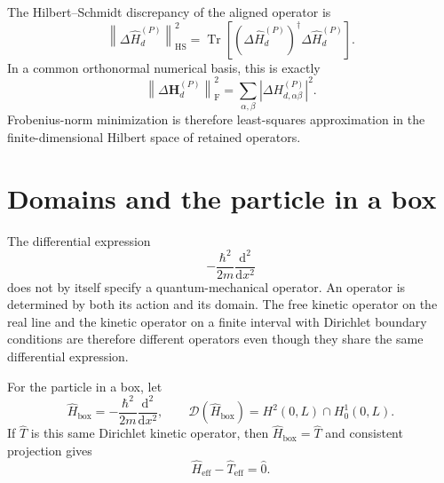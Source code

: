 The Hilbert--Schmidt discrepancy of the aligned operator is
\begin{equation}
    \left\lVert
        \Delta\hat H_d^{(P)}
    \right\rVert_{\mathrm{HS}}^2
    =
    \operatorname{Tr}\!\left[
        \left(\Delta\hat H_d^{(P)}\right)^\dagger
        \Delta\hat H_d^{(P)}
    \right].
\end{equation}
In a common orthonormal numerical basis, this is exactly
\begin{equation}
    \left\lVert
        \Delta\mathbf H_d^{(P)}
    \right\rVert_{\mathrm F}^2
    =
    \sum_{\alpha,\beta}
    \left\lvert
        \Delta H_{d,\alpha\beta}^{(P)}
    \right\rvert^2.
\end{equation}
Frobenius-norm minimization is therefore least-squares approximation in the
finite-dimensional Hilbert space of retained operators.

\section{Domains and the particle in a box}

The differential expression
\begin{equation}
    -\frac{\hbar^2}{2m}
    \frac{\mathrm{d}^2}{\mathrm{d}x^2}
\end{equation}
does not by itself specify a quantum-mechanical operator. An operator is
determined by both its action and its domain. The free kinetic operator on the
real line and the kinetic operator on a finite interval with Dirichlet boundary
conditions are therefore different operators even though they share the same
differential expression.


For the particle in a box, let
\begin{equation}
    \hat H_{\mathrm{box}}
    =
    -\frac{\hbar^2}{2m}
    \frac{\mathrm{d}^2}{\mathrm{d}x^2},
    \qquad
    \mathcal D(\hat H_{\mathrm{box}})
    =
    H^2(0,L)\cap H_0^1(0,L).
\end{equation}
If $\hat T$ is this same Dirichlet kinetic operator, then
$\hat H_{\mathrm{box}}=\hat T$ and consistent projection gives
\begin{equation}
    \hat H_{\mathrm{eff}}-\hat T_{\mathrm{eff}}
    =
    \hat 0.
\end{equation}

